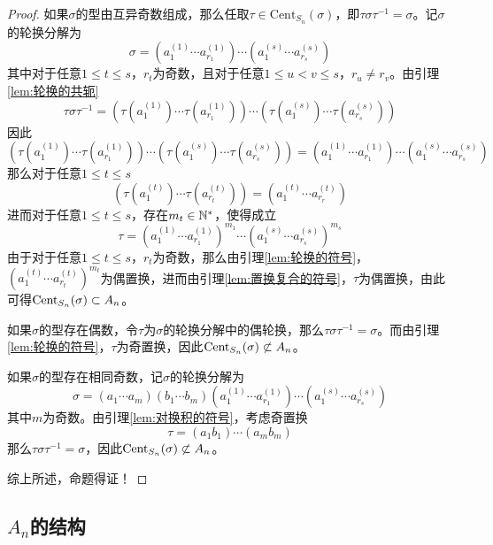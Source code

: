 \begin{proof}
	如果$\sigma$的型由互异奇数组成，那么任取$\tau\in\mathrm{Cent}_{S_n}(\sigma)$，即$\tau\sigma\tau^{-1}=\sigma$。记$\sigma$的轮换分解为
	$$
	\sigma=(a_1^{(1)}\cdots a_{r_1}^{(1)})\cdots (a_1^{(s)}\cdots a_{r_s}^{(s)})
	$$
	其中对于任意$1\le t\le s$，$r_t$为奇数，且对于任意$1\le u<v\le s$，$r_u\ne r_v$。由引理\ref{lem:轮换的共轭}
	$$
	\tau\sigma\tau^{-1}=
	(\tau(a_1^{(1)})\cdots \tau(a_{r_1}^{(1)}))\cdots (\tau(a_1^{(s)})\cdots \tau (a_{r_s}^{(s)}))
	$$
	因此
	$$
	(\tau(a_1^{(1)})\cdots \tau(a_{r_1}^{(1)}))\cdots (\tau(a_1^{(s)})\cdots \tau (a_{r_s}^{(s)}))
	=(a_1^{(1)}\cdots a_{r_1}^{(1)})\cdots (a_1^{(s)}\cdots a_{r_s}^{(s)})
	$$
	那么对于任意$1\le t\le s$
	$$
	(\tau(a_1^{(t)})\cdots \tau(a_{r_t}^{(t)}))=(a_1^{(t)}\cdots a_{r_r}^{(t)})
	$$
	进而对于任意$1\le t\le s$，存在$m_t\in\mathbb{N}^*$，使得成立
	$$
	\tau=(a_1^{(1)}\cdots a_{r_1}^{(1)})^{m_1}\cdots (a_1^{(s)}\cdots a_{r_s}^{(s)})^{m_s}
	$$
	由于对于任意$1\le t\le s$，$r_t$为奇数，那么由引理\ref{lem:轮换的符号}，$(a_1^{(t)}\cdots a_{r_t}^{(t)})^{m_t}$为偶置换，进而由引理\ref{lem:置换复合的符号}，$\tau$为偶置换，由此可得$\mathrm{Cent}_{S_n}(\sigma)\subset A_n$。
	
	如果$\sigma$的型存在偶数，令$\tau$为$\sigma$的轮换分解中的偶轮换，那么$\tau\sigma\tau^{-1}=\sigma$。而由引理\ref{lem:轮换的符号}，$\tau$为奇置换，因此$\mathrm{Cent}_{S_n}(\sigma)\not\subset A_n$。
	
	如果$\sigma$的型存在相同奇数，记$\sigma$的轮换分解为
	$$
	\sigma=(a_1\cdots a_m)(b_1\cdots b_m)(a_1^{(1)}\cdots a_{r_1}^{(1)})\cdots (a_1^{(s)}\cdots a_{r_s}^{(s)})
	$$
	其中$m$为奇数。由引理\ref{lem:对换积的符号}，考虑奇置换
	$$
	\tau=(a_1b_1)\cdots(a_mb_m)
	$$
	那么$\tau\sigma\tau^{-1}=\sigma$，因此$\mathrm{Cent}_{S_n}(\sigma)\not\subset A_n$。
	
	综上所述，命题得证！
\end{proof}

\subsection{$A_n$的结构}

